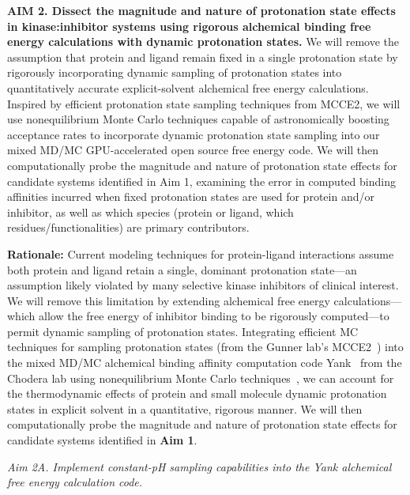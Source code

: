 \documentclass[11pt]{article}
\begin{document}
\eject 

\begin{mdframed}[middlelinewidth=2pt]
{\bf AIM 2. Dissect the magnitude and nature of protonation state effects in kinase:inhibitor systems using rigorous alchemical binding free energy calculations with dynamic protonation states.}
We will remove the assumption that protein and ligand remain fixed in a single protonation state by rigorously incorporating dynamic sampling of protonation states into quantitatively accurate explicit-solvent alchemical free energy calculations.
Inspired by efficient protonation state sampling techniques from MCCE2, we will use nonequilibrium Monte Carlo techniques capable of astronomically boosting acceptance rates to incorporate dynamic protonation state sampling into our mixed MD/MC GPU-accelerated open source free energy code.
We will then computationally probe the magnitude and nature of protonation state effects for candidate systems identified in Aim 1, examining the error in computed binding affinities incurred when fixed protonation states are used for protein and/or inhibitor, as well as which species (protein or ligand, which residues/functionalities) are primary contributors. 
\end{mdframed}

{\bf Rationale:}
Current modeling techniques for protein-ligand interactions assume both protein and ligand retain a single, dominant protonation state---an assumption likely violated by many selective kinase inhibitors of clinical interest.  
We will remove this limitation by extending alchemical free energy calculations---which allow the free energy of inhibitor binding to be rigorously computed---to permit dynamic sampling of protonation states.  
Integrating efficient MC techniques for sampling protonation states (from the Gunner lab's MCCE2~\cite{gunner:bba:2000:proton-electron-transfer,gunner:j-comput-chem:2009:mcce2}) into the mixed MD/MC alchemical binding affinity computation code {\sc Yank}~\cite{chodera-shirts:jcamd:2013:yank} from the Chodera lab using nonequilibrium Monte Carlo techniques~\cite{ncmc,roux:jctc:2015:constant-pH-ncmc}, we can account for the thermodynamic effects of protein and small molecule dynamic protonation states in explicit solvent in a quantitative, rigorous manner.  
We will then computationally probe the magnitude and nature of protonation state effects for candidate systems identified in {\bf Aim 1}.

\emph{Aim 2A. Implement constant-pH sampling capabilities into the {\sc Yank} alchemical free energy calculation code.}
\end{document}
